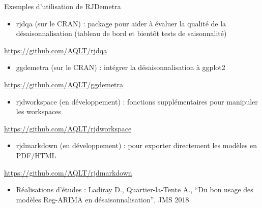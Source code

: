 \documentclass[10pt,xcolor=table,color={dvipsnames,usenames},ignorenonframetext,usepdftitle=false,french]{beamer}
\providecommand{\tightlist}{%
  \setlength{\parskip}{0pt}
  }
\begin{document}
\begin{frame}{Exemples d'utilisation de RJDemetra}
\protect\hypertarget{exemples-dutilisation-de-rjdemetra}{}

\begin{itemize}
\tightlist
\item
  rjdqa (sur le CRAN) : package pour aider à évaluer la qualité de la
  désaisonnalisation (tableau de bord et bientôt tests de saisonnalité)
\end{itemize}

\faGithub{} \url{https://github.com/AQLT/rjdqa}

\begin{itemize}
\tightlist
\item
  ggdemetra (sur le CRAN) : intégrer la désaisonnalisation à ggplot2
\end{itemize}

\faGithub{} \url{https://github.com/AQLT/ggdemetra}

\begin{itemize}
\tightlist
\item
  rjdworkspace (en développement) : fonctions supplémentaires pour
  manipuler les workspaces
\end{itemize}

\faGithub{} \url{https://github.com/AQLT/rjdworkspace}

\begin{itemize}
\tightlist
\item
  rjdmarkdown (en développement) : pour exporter directement les modèles
  en PDF/HTML
\end{itemize}

\faGithub{} \url{https://github.com/AQLT/rjdmarkdown}

\begin{itemize}
\tightlist
\item
  Réalisations d'études : Ladiray D., Quartier-la-Tente A., ``Du bon
  usage des modèles Reg-ARIMA en désaisonnalisation'', JMS 2018
\end{itemize}

\end{frame}
\end{document}

